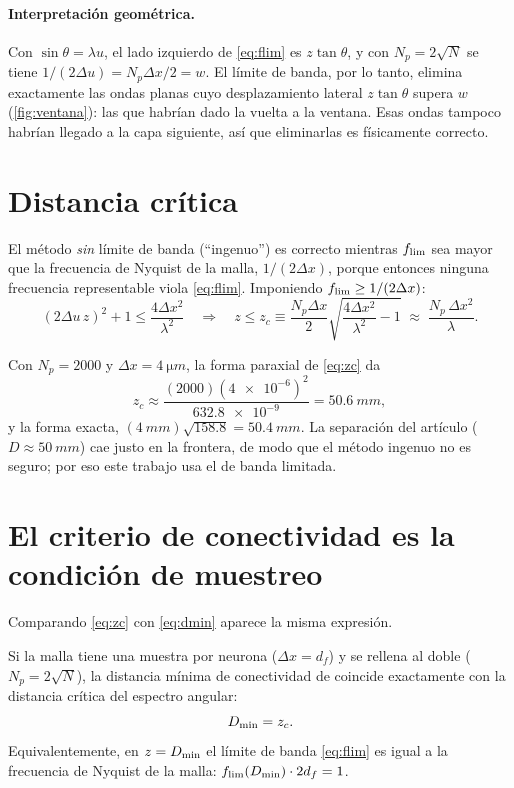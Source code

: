 \paragraph{Interpretación geométrica.} Con $\sin\theta=\lambda u$, el lado izquierdo de
\eqref{eq:flim} es $z\tan\theta$, y con $N_p=2\sqrt N$ se tiene $1/(2\Delta u)=N_p\Delta x/2=w$. El
límite de banda, por lo tanto, elimina exactamente las ondas planas cuyo desplazamiento
lateral $z\tan\theta$ supera $w$ (\cref{fig:ventana}): las que habrían dado la vuelta a la
ventana. Esas ondas tampoco habrían llegado a la capa siguiente, así que eliminarlas es
físicamente correcto.

\section{Distancia crítica}\label{sec:zc}

El método \emph{sin} límite de banda (``ingenuo'') es correcto mientras $f_{\lim}$ sea mayor que
la frecuencia de Nyquist de la malla, $1/(2\Delta x)$, porque entonces ninguna frecuencia
representable viola \eqref{eq:flim}. Imponiendo $f_{\lim}\ge1/(2\Delta x)$:
\begin{equation}
  (2\Delta u\,z)^2+1\le\frac{4\Delta x^2}{\lambda^2}
  \quad\Longrightarrow\quad
  z\le z_c\equiv\frac{N_p\Delta x}{2}\sqrt{\frac{4\Delta x^2}{\lambda^2}-1}
  \;\approx\;\frac{N_p\,\Delta x^2}{\lambda}.
  \label{eq:zc}
\end{equation}

\begin{calculo}
Con $N_p=2000$ y $\Delta x=\SI{4}{\micro m}$, la forma paraxial de \eqref{eq:zc} da
\[
  z_c\approx\frac{(2000)(\num{4e-6})^2}{\num{632.8e-9}}=\SI{50.6}{mm},
\]
y la forma exacta, $(\SI{4}{mm})\sqrt{158.8}=\SI{50.4}{mm}$. La separación del artículo
($D\approx\SI{50}{mm}$) cae justo en la frontera, de modo que el método ingenuo no es seguro;
por eso este trabajo usa el de banda limitada.
\end{calculo}

\section{El criterio de conectividad es la condición de muestreo}\label{sec:identidad}

Comparando \eqref{eq:zc} con \eqref{eq:dmin} aparece la misma expresión.

\begin{proposicion}\label{prop:identidad}
Si la malla tiene una muestra por neurona ($\Delta x=d_f$) y se rellena al doble
($N_p=2\sqrt N$), la distancia mínima de conectividad de \textcite{chen2021} coincide
exactamente con la distancia crítica del espectro angular:
\[
  D_{\min}=z_c .
\]
Equivalentemente, en $z=D_{\min}$ el límite de banda \eqref{eq:flim} es igual a la frecuencia de
Nyquist de la malla: $f_{\lim}(D_{\min})\cdot2d_f=1$.
\end{proposicion}

